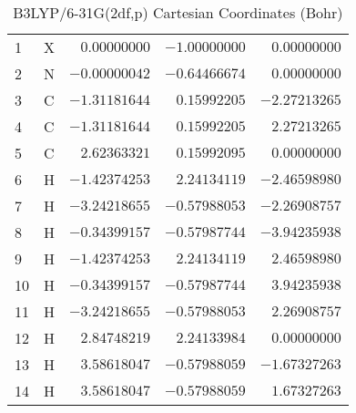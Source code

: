 \documentclass[10pt,oneside]{article}
\begin{document}
\begin{table}[h!]
\centering
\caption{B3LYP/6-31G(2df,p) Cartesian Coordinates (Bohr)}
\begin{tabular}{llrrr}
1  & X  & $ 0.00000000$ & $-1.00000000$ & $ 0.00000000$ \\
2  & N  & $-0.00000042$ & $-0.64466674$ & $ 0.00000000$ \\
3  & C  & $-1.31181644$ & $ 0.15992205$ & $-2.27213265$ \\
4  & C  & $-1.31181644$ & $ 0.15992205$ & $ 2.27213265$ \\
5  & C  & $ 2.62363321$ & $ 0.15992095$ & $ 0.00000000$ \\
6  & H  & $-1.42374253$ & $ 2.24134119$ & $-2.46598980$ \\
7  & H  & $-3.24218655$ & $-0.57988053$ & $-2.26908757$ \\
8  & H  & $-0.34399157$ & $-0.57987744$ & $-3.94235938$ \\
9  & H  & $-1.42374253$ & $ 2.24134119$ & $ 2.46598980$ \\
10 & H  & $-0.34399157$ & $-0.57987744$ & $ 3.94235938$ \\
11 & H  & $-3.24218655$ & $-0.57988053$ & $ 2.26908757$ \\
12 & H  & $ 2.84748219$ & $ 2.24133984$ & $ 0.00000000$ \\
13 & H  & $ 3.58618047$ & $-0.57988059$ & $-1.67327263$ \\
14 & H  & $ 3.58618047$ & $-0.57988059$ & $ 1.67327263$ \\
\end{tabular}
\end{table}

\clearpage
\end{document}
